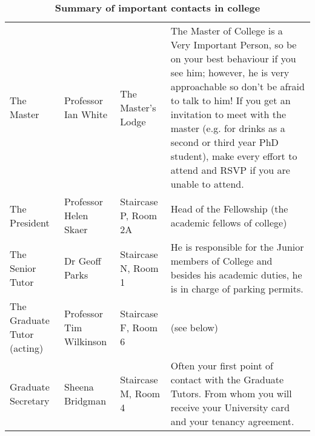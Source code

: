 \documentclass[11pt,fleqn, oneside]{book} %
\begin{document}
\begin{table}\footnotesize
\caption{\textbf{Summary of important contacts in college}}
\label{important_people}
    \begin{tabular}{L{2.5cm}L{2cm}L{2cm}L{6cm}}
    The Master                          & Professor Ian White             & The Master’s Lodge                      & The Master of College is a Very Important Person, so be on your best behaviour if you see him; however, he is very approachable so don’t be afraid to talk to him! If you get an invitation to meet with the master (e.g. for drinks as a second or third year PhD student), make every effort to attend and RSVP if you are unable to attend.  \\
    The President                       & Professor Helen Skaer           & Staircase P, Room 2A                    & Head of the Fellowship (the academic fellows of college)                                                                                                                                                                                                                                                                                        \\
    The Senior Tutor                    & Dr Geoff Parks                  & Staircase N, Room 1                     & He is responsible for the Junior members of College and besides his academic duties, he is in charge of parking permits.                                                                                                                                                                                                                        \\
    The Graduate Tutor (acting)         & Professor Tim Wilkinson         & Staircase F, Room 6                     & (see below)                                                                                                                                                                                                                                                                                                                                     \\
    Graduate Secretary                  & Sheena Bridgman                 & Staircase M, Room 4                     & Often your first point of contact with the Graduate Tutors. From whom you will receive your University card and your tenancy agreement.                                                                                                                                                                                                         \\

\end{tabular}
\end{table}
\end{document}
